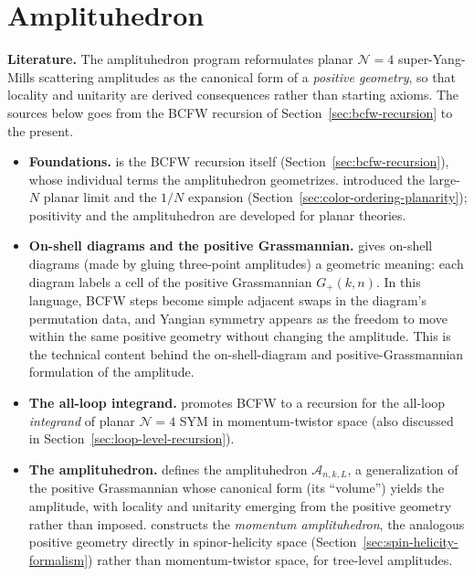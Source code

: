 \section{Amplituhedron}
\label{sec:amplituhedron}

\textbf{Literature.} The amplituhedron program reformulates planar $\mathcal{N}=4$ super-Yang-Mills scattering amplitudes as the canonical form of a \emph{positive geometry}, so that locality and unitarity are derived consequences rather than starting axioms. The sources below goes from the BCFW recursion of Section~\ref{sec:bcfw-recursion} to the present.

\begin{itemize}
    \item \textbf{Foundations.} \autocite{Britto:2005fq} is the BCFW recursion itself (Section~\ref{sec:bcfw-recursion}), whose individual terms the amplituhedron geometrizes. \autocite{hooftPlanarDiagram1974} introduced the large-$N$ planar limit and the $1/N$ expansion (Section~\ref{sec:color-ordering-planarity}); positivity and the amplituhedron are developed for planar theories.

    \item \textbf{On-shell diagrams and the positive Grassmannian.} \autocite{Arkani-Hamed:2012zlh} gives on-shell diagrams (made by gluing three-point amplitudes) a geometric meaning: each diagram labels a cell of the positive Grassmannian $G_+(k,n)$. In this language, BCFW steps become simple adjacent swaps in the diagram's permutation data, and Yangian symmetry appears as the freedom to move within the same positive geometry without changing the amplitude.
    This is the technical content behind the on-shell-diagram and positive-Grassmannian formulation of the amplitude.

    \item \textbf{The all-loop integrand.} \autocite{Arkani-Hamed:2010zjl} promotes BCFW to a recursion for the all-loop \emph{integrand} of planar $\mathcal{N}=4$ SYM in momentum-twistor space (also discussed in Section~\ref{sec:loop-level-recursion}).

    \item \textbf{The amplituhedron.} \autocite{Arkani-Hamed:2013jha} defines the amplituhedron $\mathcal{A}_{n,k,L}$, a generalization of the positive Grassmannian whose canonical form (its ``volume'') yields the amplitude, with locality and unitarity emerging from the positive geometry rather than imposed. \autocite{Damgaard:2019ztj} constructs the \emph{momentum amplituhedron}, the analogous positive geometry directly in spinor-helicity space (Section~\ref{sec:spin-helicity-formalism}) rather than momentum-twistor space, for tree-level amplitudes.


\end{itemize}
